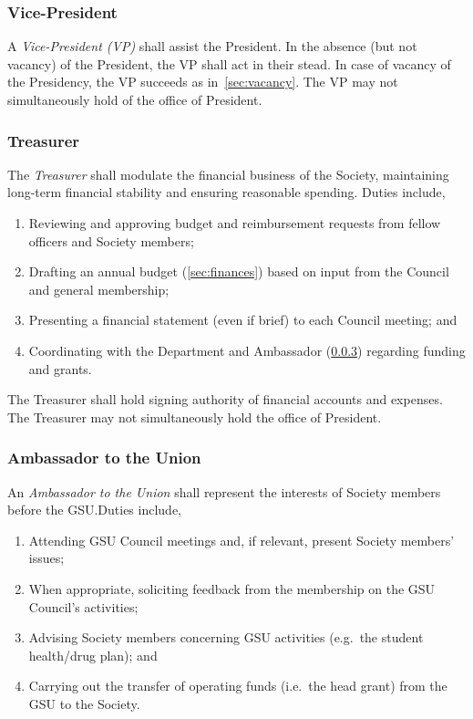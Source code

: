 \subsubsection{Vice-President}

A \textit{Vice-President (VP)} shall assist the President. In the absence (but
not vacancy) of the President, the VP shall act in their stead. In case of
vacancy of the Presidency, the VP succeeds as in~\ref{sec:vacancy}. The VP may
not simultaneously hold of the office of President.

\subsubsection{Treasurer}\label{sec:treasurer}

The \textit{Treasurer} shall modulate the financial business of the Society,
maintaining long-term financial stability and ensuring reasonable spending.
Duties include,

\begin{enumerate}
      \item Reviewing and approving budget and reimbursement requests from fellow officers
            and Society members;
      \item Drafting an annual budget (\ref{sec:finances}) based on input from the Council
            and general membership;
      \item Presenting a financial statement (even if brief) to each Council meeting; and
      \item Coordinating with the Department and Ambassador (\ref{sec:ambassador})
            regarding funding and grants.
\end{enumerate}
The Treasurer shall hold signing authority of financial accounts and expenses. The Treasurer may not simultaneously hold the office of President.

\subsubsection{Ambassador to the Union}\label{sec:ambassador}

An \textit{Ambassador to the Union} shall represent the interests of Society
members before the GSU.\@ Duties include,

\begin{enumerate}
      \item Attending GSU Council meetings and, if relevant, present Society members'
            issues;
      \item When appropriate, soliciting feedback from the membership on the GSU Council's
            activities;
      \item Advising Society members concerning GSU activities (e.g.\ the student
            health/drug plan); and
      \item Carrying out the transfer of operating funds (i.e.\ the head grant) from the
            GSU to the Society.
\end{enumerate}

